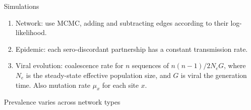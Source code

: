 \documentclass{beamer}
\begin{document}
\begin{frame}{Simulations}
  \begin{enumerate}
    \setlength{\itemsep}{12pt}
    \item Network: use MCMC, adding and subtracting edges according to their
      log-likelihood.
    \item Epidemic: each sero-discordant partnership has a constant
      transmission rate.
    \item Viral evolution: coalescence rate for $n$ sequences of $n(n-1) /
      2N_eG$, where $N_e$ is the steady-state effective population size, and
      $G$ is viral the generation time. Also mutation rate $\mu_x$ for each
      site $x$.
  \end{enumerate}
\end{frame}

\begin{frame}{Prevalence varies across network types}
  \begin{columns}
    \begin{column}{0.5\textwidth}

\end{column}
\end{columns}
\end{frame}
\end{document}
